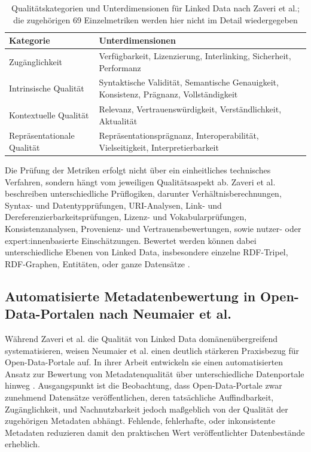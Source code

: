 \begin{table}[h!]
\centering
\small
\renewcommand{\arraystretch}{1.3}
\begin{tabular}{|p{3.5cm}|p{9.3cm}|}
\hline
\textbf{Kategorie} & \textbf{Unterdimensionen} \\
\hline
Zugänglichkeit & Verfügbarkeit, Lizenzierung, Interlinking, Sicherheit, Performanz \\ \hline
Intrinsische Qualität & Syntaktische Validität, Semantische Genauigkeit, Konsistenz, Prägnanz, Vollständigkeit \\ \hline
Kontextuelle Qualität & Relevanz, Vertrauenswürdigkeit, Verständlichkeit, Aktualität \\ \hline
Repräsentationale Qualität & Repräsentationsprägnanz, Interoperabilität, Vielseitigkeit, Interpretierbarkeit \\ \hline
\end{tabular}
\captionsetup{justification=centering}
\caption[Qualitätskategorien und Unterdimensionen für Linked Data nach Zaveri et al.]{Qualitätskategorien und Unterdimensionen für Linked Data nach Zaveri et al.; die zugehörigen 69 Einzelmetriken werden hier nicht im Detail wiedergegeben \cite{Zaveri2016LinkedDataQuality}}
\label{tab:zaveri_quality_metrics}
\end{table}

Die Prüfung der Metriken erfolgt nicht über ein einheitliches technisches Verfahren, sondern hängt vom jeweiligen Qualitätsaspekt ab. Zaveri et al. beschreiben unterschiedliche Prüflogiken, darunter Verhältnisberechnungen, Syntax- und Datentypprüfungen, URI-Analysen, Link- und Dereferenzierbarkeitsprüfungen, Lizenz- und Vokabularprüfungen, Konsistenzanalysen, Provenienz- und Vertrauensbewertungen, sowie nutzer- oder expert:innenbasierte Einschätzungen. Bewertet werden können dabei unterschiedliche Ebenen von Linked Data, insbesondere einzelne RDF-Tripel, RDF-Graphen, Entitäten, oder ganze Datensätze \cite{Zaveri2016LinkedDataQuality}. 

\subsection{Automatisierte Metadatenbewertung in Open-Data-Portalen nach Neumaier et al.}
\label{sec:neumaier}

Während Zaveri et al. die Qualität von Linked Data domänenübergreifend systematisieren, weisen Neumaier et al. einen deutlich stärkeren Praxisbezug für Open-Data-Portale auf. In ihrer Arbeit entwickeln sie einen automatisierten Ansatz zur Bewertung von Metadatenqualität über unterschiedliche Datenportale hinweg \cite{Neumaier2016MetadataQuality}. Ausgangspunkt ist die Beobachtung, dass Open-Data-Portale zwar zunehmend Datensätze veröffentlichen, deren tatsächliche Auffindbarkeit, Zugänglichkeit, und Nachnutzbarkeit jedoch maßgeblich von der Qualität der zugehörigen Metadaten abhängt. Fehlende, fehlerhafte, oder inkonsistente Metadaten reduzieren damit den praktischen Wert veröffentlichter Datenbestände erheblich.

